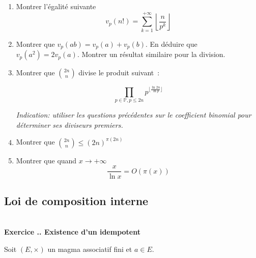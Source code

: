 \documentclass{article}
\newcommand{\mb}[1]{\mathbb{#1}}
\newcounter{exo}
\newcommand{\exercice}[1][\null]{\textbf{\\ Exercice \thesection.\theexo. #1} \addtocounter{exo}{1}}
\begin{document}
\begin{enumerate}
    \item Montrer l'égalité suivante
        \begin{equation*}
            v_p (n!) = \sum_{k = 1}^{+\infty} \left\lfloor \frac{n}{p^k} \right\rfloor
        \end{equation*}

    \item Montrer que $v_p (a b) = v_p (a) + v_p (b)$. En déduire que $v_p (a^2)
        = 2 v_p (a)$. Montrer un résultat similaire pour la division.

    \item Montrer que ${ 2n \choose n }$ divise le produit suivant~:

            \begin{equation*}
                \prod_{p \in \mb{P}, p \leq 2n} p^{ \lfloor \frac{\ln 2n}{\ln p}
                \rfloor}
            \end{equation*}

            \emph{Indication: utiliser les questions précédentes sur le coefficient
            binomial pour déterminer ses diviseurs premiers.}

    \item Montrer que ${ 2n \choose n } \leq (2n)^{\pi (2n)}$


    \item Montrer que quand $x \to +\infty$
        \begin{equation*}
            \frac{x}{\ln x} = O (\pi (x)) 
        \end{equation*}
\end{enumerate}


\subsection{Loi de composition interne}

\exercice[Existence d'un idempotent]

Soit $(E, \times)$ un magma associatif fini et $a \in E$.
\end{document}
